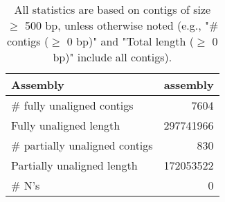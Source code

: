 \documentclass[12pt,a4paper]{article}
\begin{document}
\begin{table}[ht]
\begin{center}
\caption{All statistics are based on contigs of size $\geq$ 500 bp, unless otherwise noted (e.g., "\# contigs ($\geq$ 0 bp)" and "Total length ($\geq$ 0 bp)" include all contigs).}
\begin{tabular}{|l*{1}{|r}|}
\hline
Assembly & assembly \\ \hline
\# fully unaligned contigs & 7604 \\ \hline
Fully unaligned length & 297741966 \\ \hline
\# partially unaligned contigs & 830 \\ \hline
Partially unaligned length & 172053522 \\ \hline
\# N's & 0 \\ \hline
\end{tabular}
\end{center}
\end{table}
\end{document}
